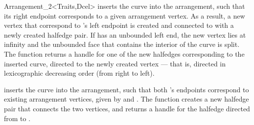 \begin{ccRefClass}{Arrangement_2<Traits,Dcel>}
  {inserts the curve  into the arrangement, such that its right
   endpoint corresponds to a given arrangement vertex. As a result, a new
   vertex that correspond to 's left endpoint is created and
   connected to  with a newly created halfedge pair.  If  has
   an unbounded left end, the new vertex lies at infinity and the
   unbounded face that contains the interior of the curve is split.
   The function returns a handle for one of the new halfedges corresponding
   to the inserted curve, directed to the newly created vertex ---
   that is, directed in lexicographic decreasing order (from right to left).
   }

  {inserts the curve  into the arrangement, such that both 's
   endpoints correspond to existing arrangement vertices, given by 
   and . The function creates a new halfedge pair that connects the
   two vertices, and returns a handle for the halfedge directed from 
   to .
   }

\begin{ccAdvanced}


\end{ccAdvanced}
\end{ccRefClass}
